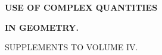 \clearpage{}
\thispagestyle{empty}
\vspace*{4cm}
\begin{center}
\textbf{\Large USE OF COMPLEX QUANTITIES}\par\bigskip
\textbf{\Large IN GEOMETRY.}\par\bigskip
SUPPLEMENTS TO VOLUME IV.
\end{center}
\clearpage
